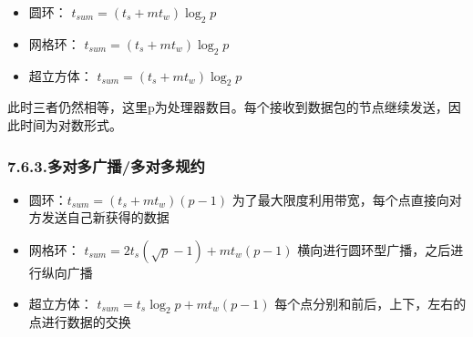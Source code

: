 \documentclass{article}
\begin{document}
\begin{itemize}[noitemsep,topsep=\mdcompacttopsep]%

\item{}圆环： $t_{sum} = (t_s + mt_w) \log _2 p$%

\item{}网格环： $t_{sum} = (t_s + mt_w) \log _2 p$%

\item{}超立方体： $t_{sum} = (t_s + mt_w) \log _2 p$%
\end{itemize}%

\noindent{}此时三者仍然相等，这里p为处理器数目。每个接收到数据包的节点继续发送，因此时间为对数形式。%

\subsubsection{7.6.3.\hspace*{0.5em}多对多广播/多对多规约}\label{section}%

\begin{itemize}[noitemsep,topsep=\mdcompacttopsep]%

\item{}圆环：$t_{sum} = (t_s + mt_w)(p - 1)$ 为了最大限度利用带宽，每个点直接向对方发送自己新获得的数据%

\item{}网格环： $t_{sum} = 2t_s(\sqrt {p} - 1) + mt_w(p  - 1)$ 横向进行圆环型广播，之后进行纵向广播%

\item{}超立方体：  $t_{sum} = t_s{\log _2 p} + mt_w(p - 1)$  每个点分别和前后，上下，左右的点进行数据的交换%
\end{itemize}%
\end{document}
